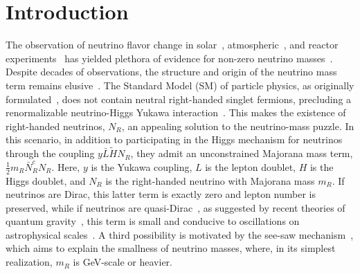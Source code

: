 \documentclass[
    aps,
    prd,
    reprint,
    amsmath,
    amssymb,
    nofootinbib,
    linenumbers,
    superscriptaddress,
    floatfix
]{revtex4-2}
\providecommand{\DIFaddtex}[1]{{\protect\color{blue}\uwave{#1}}} %
\providecommand{\DIFaddbegin}{} %
\providecommand{\DIFaddend}{} %
\providecommand{\DIFadd}[1]{\texorpdfstring{\DIFaddtex{#1}}{#1}} %
\newcommand{\DIFaddincludegraphics}[2][]{{\color{blue}\fbox{\DIFOincludegraphics[#1]{#2}}}} %
\DeclareRobustCommand{\DIFaddbegin}{\DIFOaddbegin \let\includegraphics\DIFaddincludegraphics} %
\DeclareRobustCommand{\DIFaddend}{\DIFOaddend \let\includegraphics\DIFOincludegraphics} %
\begin{document}
\maketitle
\tableofcontents




\section{\label{sec:introduction}Introduction}

The observation of neutrino flavor change in solar~\cite{Cleveland:1998nv, Super-Kamiokande:2001ljr, Borexino:2008dzn, Gann:2021ndb}, atmospheric~\cite{Super-Kamiokande:1998kpq, IceCube:2013pav, ANTARES:2018rtf, IceCubeCollaboration:2023wtb, Arguelles:2022hrt}, and reactor experiments~\cite{DayaBay:2012fng, RENO:2012mkc, Vogel:2015wua} has yielded \DIFaddbegin \DIFadd{a }\DIFaddend plethora of evidence for non-zero neutrino masses~\cite{Esteban:2018azc}.
Despite decades of observations, the structure and origin of the neutrino mass term remains elusive~\cite{Mohapatra:2005wg}.
The Standard Model (SM) of particle physics, as originally formulated~\cite{Weinberg:1967tq, Weinberg:2004kv}, does not contain neutral right-handed singlet fermions, precluding a renormalizable neutrino-Higgs Yukawa interaction~\cite{Higgs:1964pj}.
This makes the existence of right-handed neutrinos, $N_R$, an appealing solution to the neutrino-mass puzzle.
In this scenario, in addition to participating in the Higgs mechanism for neutrinos through the coupling $y \bar L \tilde H N_R$, they admit an unconstrained Majorana mass term, $\frac{1}{2} m_R \bar N_R^c N_R$.
Here, $y$ is the Yukawa coupling, $L$ is the lepton doublet, $H$ is the Higgs doublet, and $N_R$ is the right-handed neutrino with Majorana mass $m_R$.
If neutrinos are Dirac, this latter term is exactly zero and lepton number is preserved, while if neutrinos are quasi-Dirac~\cite{Valle:1983dk}, as suggested by recent theories of quantum gravity~\cite{Ooguri:2016pdq, Arkani-Hamed:2007ryu, Gonzalo:2021zsp, Vafa:2024fpx}, this term is small and conducive to oscillations on astrophysical scales~\cite{Crocker:2001zs, Keranen:2003xd,Beacom:2003eu, Esmaili:2009fk, Esmaili:2012ac, Shoemaker:2015qul, Carloni:2022cqz}.
A third possibility is motivated by the see-saw mechanism~\cite{Minkowski:1977sc, Mohapatra:1979ia, GellMann:1980vs, Yanagida:1979as, Lazarides:1980nt, Mohapatra:1980yp, Schechter:1980gr, Cheng:1980qt, Foot:1988aq}, which aims to explain the smallness of neutrino masses, where, in its simplest realization, $m_R$ is GeV-scale or heavier.
\end{document}
